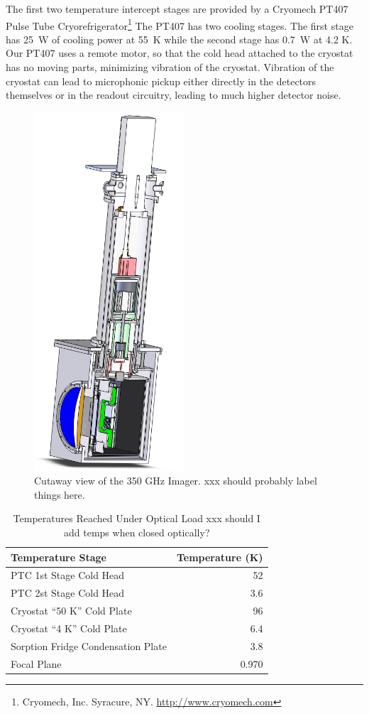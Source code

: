 \documentclass[10pt,twocolumn,article]{memoir}
\begin{document}
The first two temperature intercept stages are provided by a Cryomech PT407 Pulse Tube Cryorefrigerator\footnote{Cryomech, Inc. Syracure, NY. \url{http://www.cryomech.com}}
The PT407 has two cooling stages.
The first stage has 25~W of cooling power at 55~K while the second stage has 0.7~W at 4.2 K.
Our PT407 uses a remote motor, so that the cold head attached to the cryostat has no moving parts, minimizing vibration of the cryostat.
Vibration of the cryostat can lead to microphonic pickup either directly in the detectors themselves or in the readout circuitry, leading to much higher detector noise.

\begin{figure}[th]
\centering
\includegraphics[width=0.5\textwidth]{images/cryostat-cutaway.png}
\caption{Cutaway view of the 350 GHz Imager. xxx should probably label things here.}
\label{fig:cryo-cutaway}
\end{figure}

\begin{table}[ht]
\centering
\caption{Temperatures Reached Under Optical Load xxx should I add temps when closed optically?}
\label{tab:temp-optical-load}
\begin{tabular}{l r}
\toprule
Temperature Stage &  Temperature (K)\\
\midrule
PTC 1st Stage Cold Head 			& 52 \\
PTC 2st Stage Cold Head 			& 3.6 \\
Cryostat ``50 K'' Cold Plate 		& 96 \\
Cryostat ``4 K'' Cold Plate 			& 6.4 \\
Sorption Fridge Condensation Plate 	& 3.8 \\
Focal Plane 						& 0.970 \\
\bottomrule
\end{tabular}
\end{table}
\end{document}
